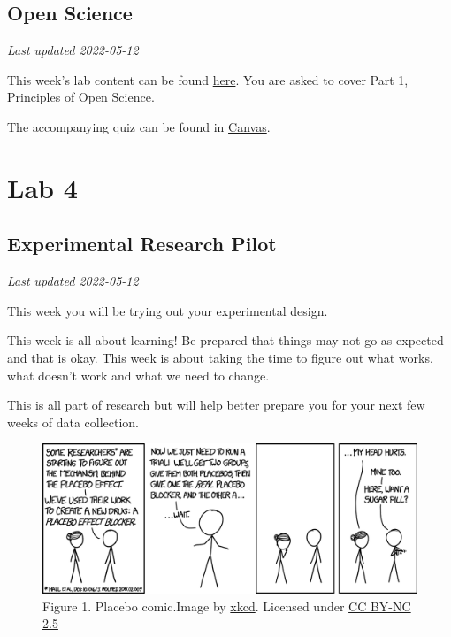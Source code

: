 \documentclass[
]{book}
\begin{document}
\hypertarget{open-science-1}{%
\chapter*{Open Science}\label{open-science-1}}

\emph{Last updated 2022-05-12}

This week's lab content can be found \href{https://ubco-biology.github.io/OS-Introduction/}{here}. You are asked to cover Part 1, Principles of Open Science.

The accompanying quiz can be found in \href{https://canvas.ubc.ca}{Canvas}.

\hypertarget{part-lab-4}{%
\part*{Lab 4}\label{part-lab-4}}

\hypertarget{experimental-research-pilot}{%
\chapter*{Experimental Research Pilot}\label{experimental-research-pilot}}

\emph{Last updated 2022-05-12}

This week you will be trying out your experimental design.

This week is all about learning! Be prepared that things may not go as expected and that is okay. This week is about taking the time to figure out what works, what doesn't work and what we need to change.

This is all part of research but will help better prepare you for your next few weeks of data collection.

\begin{figure}
\centering
\includegraphics{figures_images/Lab4-Fig1.png}
\caption{Figure 1. Placebo comic.Image by \href{https://xkcd.com/1526/}{xkcd}. Licensed under \href{https://creativecommons.org/licenses/by-nc/2.5/}{CC BY-NC 2.5}}
\end{figure}
\end{document}
